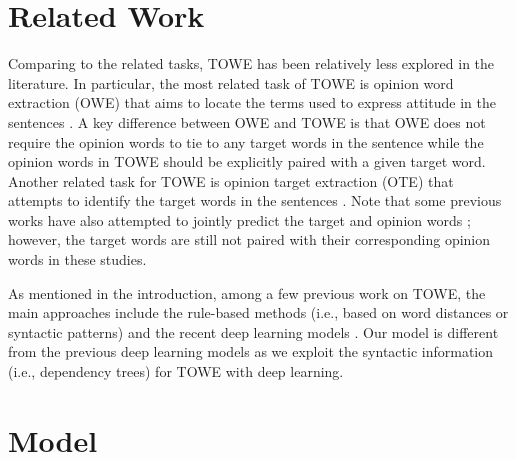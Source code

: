 \documentclass[11pt,a4paper]{article}
\begin{document}
\section{Related Work}











Comparing to the related tasks, TOWE has been relatively less explored in the literature. In particular, the most related task of TOWE is opinion word extraction (OWE) that aims to locate the terms used to express attitude in the sentences \citep{htay2013extracting, shamshurin2012extracting}. A key difference between OWE and TOWE is that OWE does not require the opinion words to tie to any target words in the sentence while the opinion words in TOWE should be explicitly paired with a given target word. Another related task for TOWE is opinion target extraction (OTE) that attempts to identify the target words in the sentences \citep{qiu2011opinion,liu2015fine,poria2016aspect,yin2016unsupervised,xu2018double}. Note that some previous works have also attempted to jointly predict the target and opinion words \citep{qiu2011opinion,liu2013opinion,wang2016recursive,wang2017coupled,li2017deep}; however, the target words are still not paired with their corresponding opinion words in these studies.



As mentioned in the introduction, among a few previous work on TOWE, the main approaches include the rule-based methods (i.e., based on word distances or syntactic patterns) \citep{zhuang2006movie,hu2004mining} and the recent deep learning models \cite{fan2019target,wu2020latent}. Our model is different from the previous deep learning models as we exploit the syntactic information (i.e., dependency trees) for TOWE with deep learning.













\section{Model}
\end{document}
